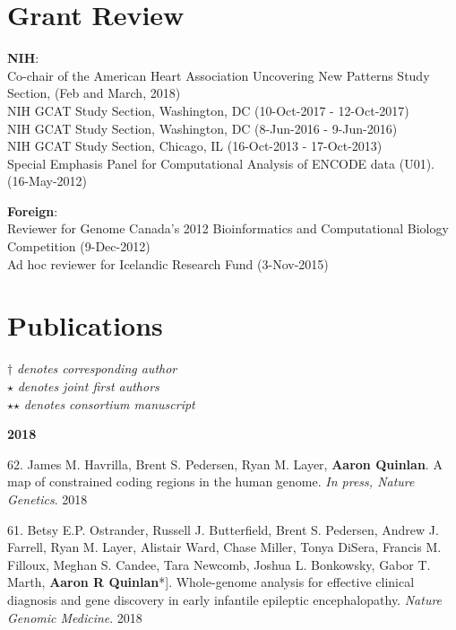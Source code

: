 \documentclass[margin,line]{cv}
\begin{document}
\begin{resume}
    \section{\mysidestyle Grant Review}
    \textbf{NIH}:\\
    Co-chair of the American Heart Association Uncovering New Patterns Study Section, (Feb and March, 2018)\\
    NIH GCAT Study Section, Washington, DC (10-Oct-2017 - 12-Oct-2017)\\
    NIH GCAT Study Section, Washington, DC (8-Jun-2016 - 9-Jun-2016)\\
    NIH GCAT Study Section, Chicago, IL (16-Oct-2013 - 17-Oct-2013)\\
    Special Emphasis Panel for Computational Analysis of ENCODE data (U01). (16-May-2012)

    \textbf{Foreign}:\\
    Reviewer for Genome Canada's 2012 Bioinformatics and Computational Biology Competition (9-Dec-2012)\\
    Ad hoc reviewer for Icelandic Research Fund (3-Nov-2015)
    \section{\mysidestyle Publications}
    $\dagger$\textit{ denotes corresponding author}\\
    $\star$\textit{ denotes joint first authors}\\
    $\star$$\star$\textit{ denotes consortium manuscript}


    \textbf{2018} \\

    \begin{list}{*}{}

    \item[62.] James M. Havrilla, Brent S. Pedersen, Ryan M. Layer, \textbf{Aaron Quinlan}. A map of constrained coding regions in the human genome. \emph{In press, Nature Genetics}. 2018

    \item[61.] Betsy E.P. Ostrander, Russell J. Butterfield, Brent S. Pedersen, Andrew J. Farrell, Ryan M. Layer, Alistair Ward, Chase Miller, Tonya DiSera, Francis M. Filloux, Meghan S. Candee, Tara Newcomb, Joshua L. Bonkowsky, Gabor T. Marth, \textbf{Aaron R Quinlan}*]. Whole-genome analysis for effective clinical diagnosis and gene discovery in early infantile epileptic encephalopathy. \emph{Nature Genomic Medicine}. 2018


\end{list}
\end{resume}
\end{document}
